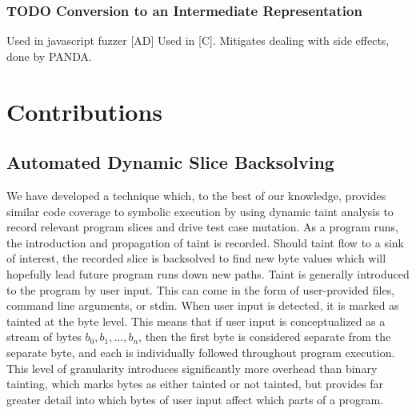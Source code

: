 \documentclass[11pt,expanded,copyright]{fsuthesis}
\begin{document}
\subsection{TODO Conversion to an Intermediate Representation}

Used in javascript fuzzer [AD]
Used in [C].
Mitigates dealing with side effects, done by PANDA.

\chapter{Contributions}

\section{Automated Dynamic Slice Backsolving}

We have developed a technique which, to the best of our knowledge, provides similar code coverage to symbolic execution by using dynamic taint analysis to record relevant program slices and drive test case mutation. As a program runs, the introduction and propagation of taint is recorded. Should taint flow to a sink of interest, the recorded slice is backsolved to find new byte values which will hopefully lead future program runs down new paths. Taint is generally introduced to the program by user input. This can come in the form of user-provided files, command line arguments, or stdin. When user input is detected, it is marked as tainted at the byte level. This means that if user input is conceptualized as a stream of bytes $b_0,b_1,...,b_n$, then the first byte is considered separate from the separate byte, and each is individually followed throughout program execution. This level of granularity introduces significantly more overhead than binary tainting, which marks bytes as either tainted or not tainted, but provides far greater detail into which bytes of user input affect which parts of a program.
\end{document}
